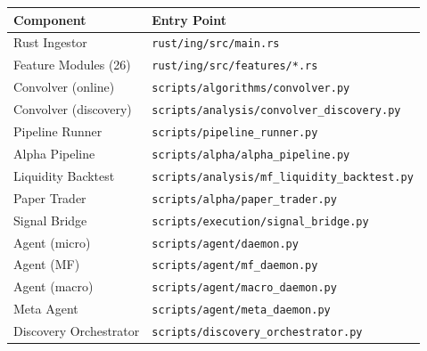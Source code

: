\documentclass[11pt,a4paper]{article}
\begin{document}
\begin{longtable}{|l|l|}
\hline
\textbf{Component} & \textbf{Entry Point} \\
\hline
Rust Ingestor & \texttt{rust/ing/src/main.rs} \\
Feature Modules (26) & \texttt{rust/ing/src/features/*.rs} \\
Convolver (online) & \texttt{scripts/algorithms/convolver.py} \\
Convolver (discovery) & \texttt{scripts/analysis/convolver\_discovery.py} \\
Pipeline Runner & \texttt{scripts/pipeline\_runner.py} \\
Alpha Pipeline & \texttt{scripts/alpha/alpha\_pipeline.py} \\
Liquidity Backtest & \texttt{scripts/analysis/mf\_liquidity\_backtest.py} \\
Paper Trader & \texttt{scripts/alpha/paper\_trader.py} \\
Signal Bridge & \texttt{scripts/execution/signal\_bridge.py} \\
Agent (micro) & \texttt{scripts/agent/daemon.py} \\
Agent (MF) & \texttt{scripts/agent/mf\_daemon.py} \\
Agent (macro) & \texttt{scripts/agent/macro\_daemon.py} \\
Meta Agent & \texttt{scripts/agent/meta\_daemon.py} \\
Discovery Orchestrator & \texttt{scripts/discovery\_orchestrator.py} \\
\hline
\end{longtable}
\end{document}
